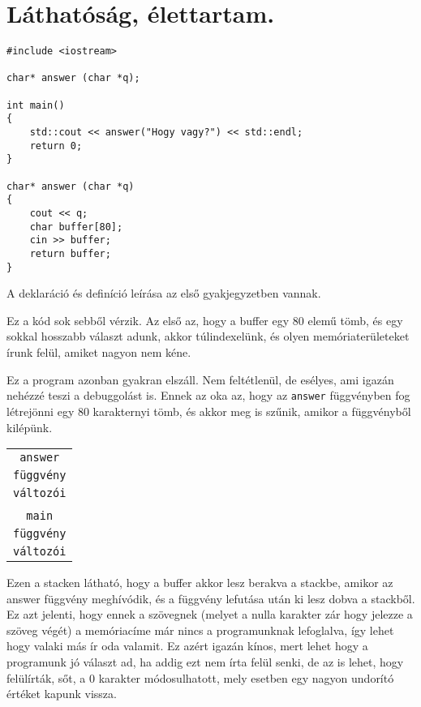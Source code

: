 \documentclass[a4paper,11.5pt]{article}
\begin{document}
	\section{Láthatóság, élettartam.}
	\begin{example}
		\begin{lstlisting}
#include <iostream>

char* answer (char *q);
		
int main()
{
	std::cout << answer("Hogy vagy?") << std::endl;
	return 0;
}

char* answer (char *q)
{
	cout << q;
	char buffer[80];
	cin >> buffer;
	return buffer;
}
		\end{lstlisting}
		A deklaráció és definíció leírása az első gyakjegyzetben vannak.
		
		Ez a kód sok sebből vérzik. Az első az, hogy a buffer egy 80 elemű tömb, és egy sokkal hosszabb választ adunk, akkor túlindexelünk, és olyen memóriaterületeket írunk felül, amiket nagyon nem kéne.
		
		Ez a program azonban gyakran elszáll. Nem feltétlenül, de esélyes, ami igazán nehézzé teszi a debuggolást is. Ennek az oka az, hogy az \texttt{answer} függvényben fog létrejönni egy 80 karakternyi tömb, és akkor meg is szűnik, amikor a függvényből kilépünk.
		\begin{center}
			\begin{tabular}{|c|}
				\\
				\hline
				\texttt{answer}\\
				\texttt{függvény}\\
				\texttt{változói}\\
				\hline
				\\
				\hline
				\texttt{main}\\
				\texttt{függvény}\\
				\texttt{változói}\\
				\hline
			\end{tabular}
		\end{center}
		Ezen a stacken látható, hogy a buffer akkor lesz berakva a stackbe, amikor az answer függvény meghívódik, és a függvény lefutása után ki lesz dobva a stackből. Ez azt jelenti, hogy ennek a szövegnek (melyet a nulla karakter zár hogy jelezze a szöveg végét) a memóriacíme már nincs a programunknak lefoglalva, így lehet hogy valaki más ír oda valamit. Ez azért igazán kínos, mert lehet hogy a programunk jó választ ad, ha addig ezt nem írta felül senki, de az is lehet, hogy felülírták, sőt, a 0 karakter módosulhatott, mely esetben egy nagyon undorító értéket kapunk vissza.
	\end{example}
\end{document}
